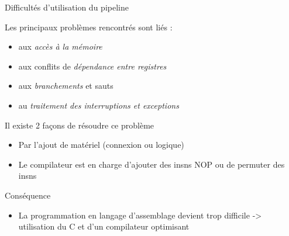%
\begin{Frame}{Difficultés d'utilisation du pipeline}

\begin{block}{Les principaux problèmes rencontrés sont liés :}
       \begin{center}
 	\begin{itemize}
         \item aux \emph{accès à la mémoire}
	 \item aux conflits de \emph{dépendance entre registres}
	 \item aux \emph{branchements} et sauts
	 \item au \emph{traitement des interruptions et exceptions}
        \end{itemize}
       \end{center}
      \end{block}   

\begin{block}{Il existe 2 façons de résoudre ce problème}
 	\begin{itemize}
         \item Par l'ajout de matériel (connexion ou logique)
	 \item Le compilateur est en charge d'ajouter des insns NOP ou de
       permuter des insns
        \end{itemize}
      \end{block}   

\begin{block}{Conséquence}
       \begin{center}
 	\begin{itemize}
    \item La programmation en langage d'assemblage devient trop
      difficile -> utilisation du C et d'un compilateur optimisant
        \end{itemize}
       \end{center}
      \end{block}   

\end{Frame}


